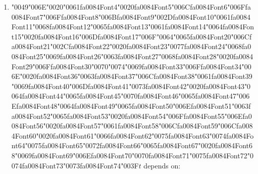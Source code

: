 \documentclass[11pt]{article}
\begin{document}
\begin{enumerate}[label=Q\arabic*., leftmargin=*]
\item {\char"0049}{\char"006E}{\char"0020}{\char"0061}{\csname fa0084Font4\endcsname\char"0020}{\csname fa0084Font5\endcsname\char"006C}{\csname fa0084Font6\endcsname\char"006F}{\csname fa0084Font7\endcsname\char"006F}{\csname fa0084Font8\endcsname\char"006B}{\csname fa0084Font9\endcsname\char"002D}{\csname fa0084Font10\endcsname\char"0061}{\csname fa0084Font11\endcsname\char"0068}{\csname fa0084Font12\endcsname\char"0065}{\csname fa0084Font13\endcsname\char"0061}{\csname fa0084Font14\endcsname\char"0064}{\csname fa0084Font15\endcsname\char"0020}{\csname fa0084Font16\endcsname\char"006D}{\csname fa0084Font17\endcsname\char"006F}{\char"0064}{\char"0065}{\csname fa0084Font20\endcsname\char"006C}{\csname fa0084Font21\endcsname\char"002C}{\csname fa0084Font22\endcsname\char"0020}{\csname fa0084Font23\endcsname\char"0077}{\csname fa0084Font24\endcsname\char"0068}{\csname fa0084Font25\endcsname\char"0069}{\csname fa0084Font26\endcsname\char"0063}{\csname fa0084Font27\endcsname\char"0068}{\csname fa0084Font28\endcsname\char"0020}{\csname fa0084Font29\endcsname\char"006F}{\csname fa0084Font30\endcsname\char"0070}{\char"0074}{\char"0069}{\csname fa0084Font33\endcsname\char"006F}{\csname fa0084Font34\endcsname\char"006E}{\char"0020}{\csname fa0084Font36\endcsname\char"0063}{\csname fa0084Font37\endcsname\char"006C}{\csname fa0084Font38\endcsname\char"0061}{\csname fa0084Font39\endcsname\char"0069}{\csname fa0084Font40\endcsname\char"006D}{\csname fa0084Font41\endcsname\char"0073}{\csname fa0084Font42\endcsname\char"0020}{\csname fa0084Font43\endcsname\char"0064}{\csname fa0084Font44\endcsname\char"0065}{\csname fa0084Font45\endcsname\char"0070}{\csname fa0084Font46\endcsname\char"0065}{\csname fa0084Font47\endcsname\char"006E}{\csname fa0084Font48\endcsname\char"0064}{\csname fa0084Font49\endcsname\char"0065}{\csname fa0084Font50\endcsname\char"006E}{\csname fa0084Font51\endcsname\char"0063}{\csname fa0084Font52\endcsname\char"0065}{\csname fa0084Font53\endcsname\char"0020}{\csname fa0084Font54\endcsname\char"006F}{\csname fa0084Font55\endcsname\char"006E}{\csname fa0084Font56\endcsname\char"0020}{\csname fa0084Font57\endcsname\char"0061}{\csname fa0084Font58\endcsname\char"006C}{\csname fa0084Font59\endcsname\char"006C}{\csname fa0084Font60\endcsname\char"0020}{\csname fa0084Font61\endcsname\char"0066}{\csname fa0084Font62\endcsname\char"0075}{\csname fa0084Font63\endcsname\char"0074}{\csname fa0084Font64\endcsname\char"0075}{\csname fa0084Font65\endcsname\char"0072}{\csname fa0084Font66\endcsname\char"0065}{\csname fa0084Font67\endcsname\char"0020}{\csname fa0084Font68\endcsname\char"0069}{\csname fa0084Font69\endcsname\char"006E}{\csname fa0084Font70\endcsname\char"0070}{\csname fa0084Font71\endcsname\char"0075}{\csname fa0084Font72\endcsname\char"0074}{\csname fa0084Font73\endcsname\char"0073}{\csname fa0084Font74\endcsname\char"003F}$t$ depends on:\\

\end{enumerate}
\end{document}
